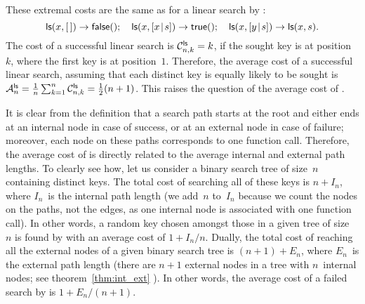 These extremal costs are the same as for a linear search by :
\begin{equation*}
\fun{ls}(x,\el)          \rightarrow  \fun{false}();\quad
\fun{ls}(x,\cons{x}{s})  \rightarrow  \fun{true}();\quad
\fun{ls}(x,\cons{y}{s})  \rightarrow  \fun{ls}(x,s).
\end{equation*}
The cost of a successful linear search is \(\C{\fun{ls}}{n,k} = k\),
if the sought key is at position~\(k\), where the first key is at
position~\(1\). Therefore, the average cost of a successful linear
search, assuming that each distinct key is equally likely to be sought
is \(\M{\fun{ls}}{n} = \frac{1}{n}\sum_{k=1}^{n}\C{\fun{ls}}{n,k} =
\tfrac{1}{2}(n+1)\).
This raises the question of the average cost of
.


It is clear from the definition that a search path starts at the root
and either ends at an internal node in case of success, or at an
external node in case of failure; moreover, each node on these paths
corresponds to one function call. Therefore, the average cost of
 is directly related to the average
internal and
external path
lengths. To clearly see how, let us consider a binary search tree of
size~\(n\) containing distinct keys. The total cost of searching all
of these keys is \(n+I_n\), where \(I_n\)~is the internal path length
(we add~\(n\) to~\(I_n\) because we count the nodes on the paths, not
the edges, as one internal node is associated with one function
call). In other words, a random key chosen amongst those in a given
tree of size~\(n\) is found by  with an average cost of
\(1+I_n/n\). Dually, the total cost of reaching all the external nodes
of a given binary search tree is \((n+1)+E_n\), where \(E_n\)~is the
external path length (there are \(n+1\) external nodes in a tree
with \(n\)~internal nodes; see theorem~\ref{thm:int_ext}
). In other words, the average cost of a failed
search by  is \(1 + E_n/(n+1)\).

